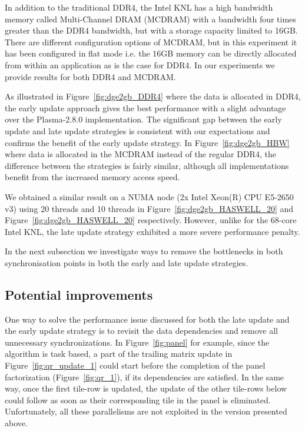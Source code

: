 In addition to the traditional DDR4, the Intel KNL has a high
bandwidth memory called Multi-Channel DRAM (MCDRAM) with a
bandwidth four times greater than the DDR4 bandwidth,
but with a storage capacity limited to 16GB.
There are different configuration options
of MCDRAM, but in this experiment it has been configured
in flat mode i.e. the 16GB memory can be directly allocated from within
an application as is the case for DDR4.
In our experiments we provide results for both DDR4 and MCDRAM.

As illustrated in Figure~\ref{fig:dge2gb_DDR4} where the data is
allocated in DDR4, the early update approach gives the best
performance with a slight advantage over the Plasma-2.8.0
implementation.
The significant gap between the early update and late update
strategies is consistent with our expectations
and confirms the benefit of the early update strategy.
In Figure~\ref{fig:dge2gb_HBW} where data is allocated in
the MCDRAM instead of the regular DDR4, the difference between the
strategies is fairly similar,
although all implementations benefit from the increased memory access
speed.

We obtained a similar result on a NUMA node (2x Intel Xeon(R)
CPU E5-2650 v3) using 20 threads and 10 threads in
Figure~\ref{fig:dge2gb_HASWELL_20} and
Figure~\ref{fig:dge2gb_HASWELL_20} respectively.
However, unlike for the 68-core Intel KNL,
the late update strategy exhibited a more severe
performance penalty.

In the next subsection we investigate ways to remove
the bottlenecks in both synchronisation points in both
the early and late update strategies.

\subsection{Potential improvements}
One way to solve the performance issue discussed for both the
late update and the early update strategy is to revisit the
data dependencies and remove all unnecessary synchronizations.
In Figure~\ref{fig:panel} for example,
since the algorithm is task based,
a part of the trailing matrix update in Figure~\ref{fig:qr_update_1}
could start before the completion of the panel factorization
(Figure~\ref{fig:qr_1}), if its dependencies are satisfied.
In the same way,
once the first tile-row is updated,
the update of the other tile-rows below could follow as
soon as their corresponding tile in the panel is eliminated.
Unfortunately, all these parallelisms are not exploited
in the version presented above.

